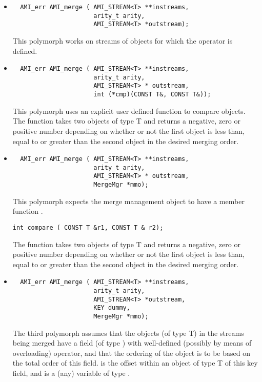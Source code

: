 \begin{itemize}
    \item
\begin{verbatim}
  AMI_err AMI_merge ( AMI_STREAM<T> **instreams,
                      arity_t arity, 
                      AMI_STREAM<T> *outstream);
\end{verbatim}
This polymorph works on streams of objects for which the operator
\myverb{<} is defined.

\item 
\begin{verbatim}
  AMI_err AMI_merge ( AMI_STREAM<T> **instreams,
                      arity_t arity,
                      AMI_STREAM<T> * outstream,
                      int (*cmp)(CONST T&, CONST T&));
\end{verbatim}
This polymorph uses an explicit user defined function to compare
objects. The function takes two objects of type T and returns a negative,
zero or positive number depending on whether or not the first object is
less than, equal to or greater than the second object in the desired
merging order.

\item
\begin{verbatim}
  AMI_err AMI_merge ( AMI_STREAM<T> **instreams,
                      arity_t arity,
                      AMI_STREAM<T> * outstream,
                      MergeMgr *mmo);
\end{verbatim}
This polymorph expects the merge management object
 to have a member function .
\begin{verbatim}
int compare ( CONST T &r1, CONST T & r2); 
\end{verbatim}
The function takes two objects of type T and returns a negative,
zero or positive number depending on whether or not the first object is
less than, equal to or greater than the second object in the desired
merging order.

\item
\begin{verbatim}
  AMI_err AMI_merge ( AMI_STREAM<T> **instreams,
                      arity_t arity,
                      AMI_STREAM<T> *outstream,
                      KEY dummy,
                      MergeMgr *mmo);
\end{verbatim}
The third polymorph assumes that the objects (of type T) in the streams
being merged have a field (of type ) with well-defined (possibly
by means of overloading) \myverb{<} operator, and that the ordering of the
object is to be based on the total order of this field.  is
the offset within an object of type T of this key field, and  is
a (any) variable of type .

\end{itemize}


